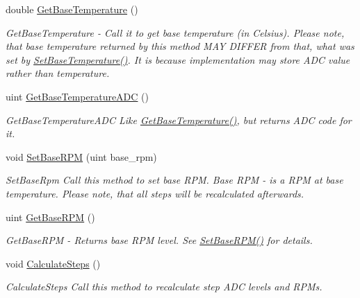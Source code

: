 \begin{DoxyCompactItemize}
double \hyperlink{class_settings_generator_a80b1ff8060a16d149989d98a88ab253e}{Get\+Base\+Temperature} ()
\begin{DoxyCompactList}\small\item\em Get\+Base\+Temperature -\/ Call it to get base temperature (in Celsius). Please note, that base temperature returned by this method M\+AY D\+I\+F\+F\+ER from that, what was set by \hyperlink{class_settings_generator_aed9e7acb30bfd559b1ac70ceeddd8973}{Set\+Base\+Temperature()}. It is because implementation may store A\+DC value rather than temperature. \end{DoxyCompactList}\item 
uint \hyperlink{class_settings_generator_a5f3f78597f001c127b89f6447a46df09}{Get\+Base\+Temperature\+A\+DC} ()
\begin{DoxyCompactList}\small\item\em Get\+Base\+Temperature\+A\+DC Like \hyperlink{class_settings_generator_a80b1ff8060a16d149989d98a88ab253e}{Get\+Base\+Temperature()}, but returns A\+DC code for it. \end{DoxyCompactList}\item 
void \hyperlink{class_settings_generator_a1c1960b9021f7081b4c42c4d7c0eda34}{Set\+Base\+R\+PM} (uint base\+\_\+rpm)
\begin{DoxyCompactList}\small\item\em Set\+Base\+Rpm Call this method to set base R\+PM. Base R\+PM -\/ is a R\+PM at base temperature. Please note, that all steps will be recalculated afterwards. \end{DoxyCompactList}\item 
uint \hyperlink{class_settings_generator_a99bbe6e67e638ccc7bf6b21b3bc36135}{Get\+Base\+R\+PM} ()
\begin{DoxyCompactList}\small\item\em Get\+Base\+R\+PM -\/ Returns base R\+PM level. See \hyperlink{class_settings_generator_a1c1960b9021f7081b4c42c4d7c0eda34}{Set\+Base\+R\+P\+M()} for details. \end{DoxyCompactList}\item 
\mbox{\label{class_settings_generator_a7c9c1a7a3928ba3ce0ad110593b97a96}} 
void \hyperlink{class_settings_generator_a7c9c1a7a3928ba3ce0ad110593b97a96}{Calculate\+Steps} ()
\begin{DoxyCompactList}\small\item\em Calculate\+Steps Call this method to recalculate step A\+DC levels and R\+P\+Ms. \end{DoxyCompactList}\item 

\end{DoxyCompactItemize}
